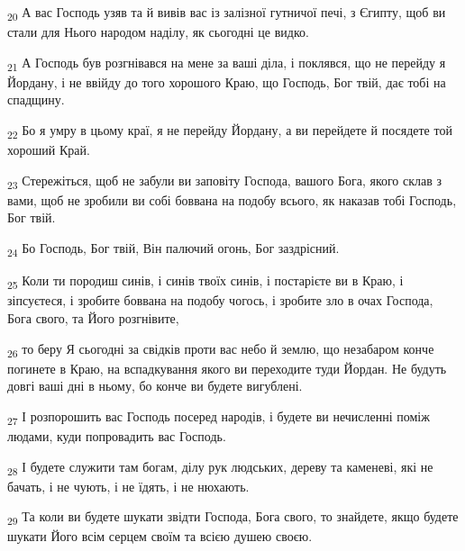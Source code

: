 \begin{tcolorbox}
\textsubscript{20} А вас Господь узяв та й вивів вас із залізної гутничої печі, з Єгипту, щоб ви стали для Нього народом наділу, як сьогодні це видко.
\end{tcolorbox}
\begin{tcolorbox}
\textsubscript{21} А Господь був розгнівався на мене за ваші діла, і поклявся, що не перейду я Йордану, і не ввійду до того хорошого Краю, що Господь, Бог твій, дає тобі на спадщину.
\end{tcolorbox}
\begin{tcolorbox}
\textsubscript{22} Бо я умру в цьому краї, я не перейду Йордану, а ви перейдете й посядете той хороший Край.
\end{tcolorbox}
\begin{tcolorbox}
\textsubscript{23} Стережіться, щоб не забули ви заповіту Господа, вашого Бога, якого склав з вами, щоб не зробили ви собі боввана на подобу всього, як наказав тобі Господь, Бог твій.
\end{tcolorbox}
\begin{tcolorbox}
\textsubscript{24} Бо Господь, Бог твій, Він палючий огонь, Бог заздрісний.
\end{tcolorbox}
\begin{tcolorbox}
\textsubscript{25} Коли ти породиш синів, і синів твоїх синів, і постарієте ви в Краю, і зіпсуєтеся, і зробите боввана на подобу чогось, і зробите зло в очах Господа, Бога свого, та Його розгнівите,
\end{tcolorbox}
\begin{tcolorbox}
\textsubscript{26} то беру Я сьогодні за свідків проти вас небо й землю, що незабаром конче погинете в Краю, на вспадкування якого ви переходите туди Йордан. Не будуть довгі ваші дні в ньому, бо конче ви будете вигублені.
\end{tcolorbox}
\begin{tcolorbox}
\textsubscript{27} І розпорошить вас Господь посеред народів, і будете ви нечисленні поміж людами, куди попровадить вас Господь.
\end{tcolorbox}
\begin{tcolorbox}
\textsubscript{28} І будете служити там богам, ділу рук людських, дереву та каменеві, які не бачать, і не чують, і не їдять, і не нюхають.
\end{tcolorbox}
\begin{tcolorbox}
\textsubscript{29} Та коли ви будете шукати звідти Господа, Бога свого, то знайдете, якщо будете шукати Його всім серцем своїм та всією душею своєю.
\end{tcolorbox}
